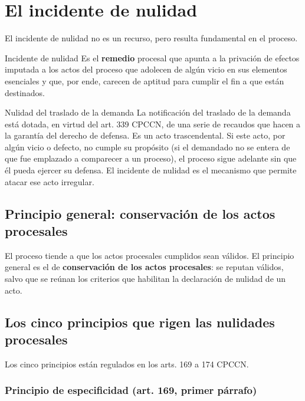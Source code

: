 \documentclass[12pt,oneside]{book}
\begin{document}
\chapter{El incidente de nulidad}\label{cap:nulidad}

El incidente de nulidad no es un recurso, pero resulta fundamental en el proceso.

\begin{definition}{Incidente de nulidad}
Es el \textbf{remedio} procesal que apunta a la privación de efectos imputada a los actos del proceso que adolecen de algún vicio en sus elementos esenciales y que, por ende, carecen de aptitud para cumplir el fin a que están destinados.
\end{definition}

\begin{example}{Nulidad del traslado de la demanda}
La notificación del traslado de la demanda está dotada, en virtud del art. 339 CPCCN, de una serie de recaudos que hacen a la garantía del derecho de defensa. Es un acto trascendental. Si este acto, por algún vicio o defecto, no cumple su propósito (si el demandado no se entera de que fue emplazado a comparecer a un proceso), el proceso sigue adelante sin que él pueda ejercer su defensa. El incidente de nulidad es el mecanismo que permite atacar ese acto irregular.
\end{example}

\section{Principio general: conservación de los actos procesales}

El proceso tiende a que los actos procesales cumplidos sean válidos. El principio general es el de \textbf{conservación de los actos procesales}: se reputan válidos, salvo que se reúnan los criterios que habilitan la declaración de nulidad de un acto.

\section{Los cinco principios que rigen las nulidades procesales}

Los cinco principios están regulados en los arts. 169 a 174 CPCCN.

\subsection{Principio de especificidad (art. 169, primer párrafo)}
\end{document}
